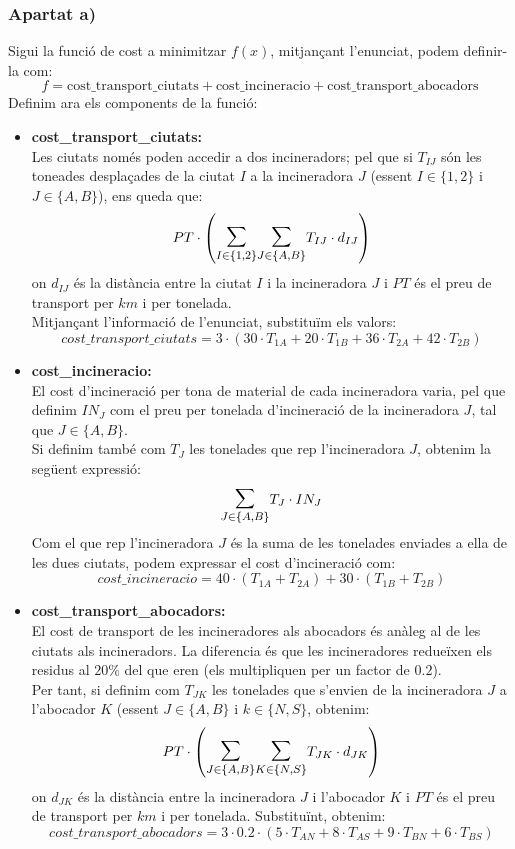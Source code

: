 \documentclass[a4paper, 11pt]{article}
\begin{document}
\subsubsection{Apartat a)}
Sigui la funció de cost a minimitzar $f(x)$, mitjançant l'enunciat, podem definir-la com:
$$f =   \text{cost\_transport\_ciutats}  + \text{cost\_incineracio}  +  \text{cost\_transport\_abocadors} $$
 Definim ara els components de la funció:
 \begin{itemize}
     \item \textbf{cost\_transport\_ciutats:}\\
     Les ciutats només poden accedir a dos incineradors; pel que si $T_{IJ}$ són les toneades desplaçades de la ciutat $I$ a la incineradora $J$ (essent $I\in \{1,2\}$ i $J \in \{A,B\}$), ens queda que:\\
     $$PT\cdot \left( \mathlarger{\mathlarger{\sum}}_{I\in \{1,2\}} \mathlarger{\mathlarger{\sum}}_{J \in \{A,B\}} T_{IJ} \cdot d_{IJ}\right) $$
     on $d_{IJ}$ és la distància entre la ciutat $I$ i la incineradora $J$ i $PT$ és el preu de transport per $km$ i per tonelada.\\
     Mitjançant l'informació de l'enunciat, substituïm els valors:
     $$cost\_transport\_ciutats = 3\cdot( 30\cdot T_{1A} + 20\cdot T_{1B} + 36\cdot T_{2A} + 42\cdot T_{2B})$$
     \item \textbf{cost\_incineracio:}\\
     El cost d'incineració per tona de material de cada incineradora varia, pel que definim $IN_J$ com el preu per tonelada d'incineració de la incineradora $J$, tal que $J\in\{A,B\}$.\\
     Si definim també com $T_J$ les tonelades que rep l'incineradora $J$, obtenim la següent expressió:
     $$\mathlarger{\mathlarger{\sum}}_{J \in \{A,B\}} T_J\cdot IN_J$$
     Com el que rep l'incineradora $J$ és la suma de les tonelades enviades a ella de les dues ciutats, podem expressar el cost d'incineració com:\\
    $$cost\_incineracio = 40\cdot(T_{1A} + T_{2A}) + 30\cdot(T_{1B}+T_{2B})$$
     \item \textbf{cost\_transport\_abocadors:}\\
     El cost de transport de les incineradores als abocadors és anàleg al de les ciutats als incineradors. La diferencia és que les incineradores redueïxen els residus al $20\%$ del que eren (els multipliquen per un factor de $0.2$).\\
     Per tant, si definim com $T_{JK}$ les tonelades que s'envien de la incineradora $J$ a l'abocador $K$ (essent $J \in \{A,B\}$ i $k \in \{N,S\}$, obtenim:\\
     $$PT\cdot \left( \mathlarger{\mathlarger{\sum}}_{J\in \{A,B\}} \mathlarger{\mathlarger{\sum}}_{K\in\{N,S\}} T_{JK} \cdot d_{JK}\right) $$
     on $d_{JK}$ és la distància entre la incineradora $J$ i l'abocador $K$ i $PT$ és el preu de transport per $km$ i per tonelada. Substituïnt, obtenim:\\
     $$cost\_transport\_abocadors = 3\cdot0.2 \cdot (5\cdot T_{AN} + 8\cdot T_{AS} + 9\cdot T_{BN}+ 6\cdot T_{BS})$$
 \end{itemize}
\end{document}
